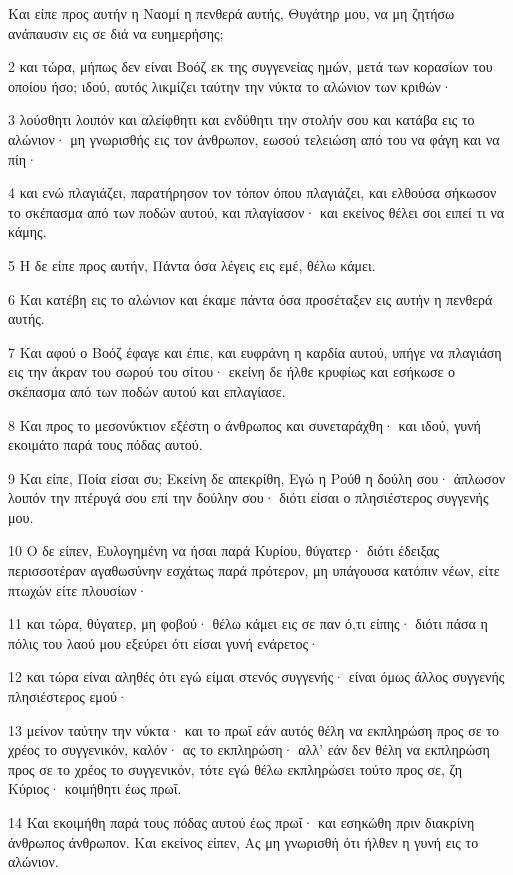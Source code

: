 \par Και είπε προς αυτήν η Ναομί η πενθερά αυτής, Θυγάτηρ μου, να μη ζητήσω ανάπαυσιν εις σε διά να ευημερήσης;
\par 2 και τώρα, μήπως δεν είναι Βοόζ εκ της συγγενείας ημών, μετά των κορασίων του οποίου ήσο; ιδού, αυτός λικμίζει ταύτην την νύκτα το αλώνιον των κριθών·
\par 3 λούσθητι λοιπόν και αλείφθητι και ενδύθητι την στολήν σου και κατάβα εις το αλώνιον· μη γνωρισθής εις τον άνθρωπον, εωσού τελειώση από του να φάγη και να πίη·
\par 4 και ενώ πλαγιάζει, παρατήρησον τον τόπον όπου πλαγιάζει, και ελθούσα σήκωσον το σκέπασμα από των ποδών αυτού, και πλαγίασον· και εκείνος θέλει σοι ειπεί τι να κάμης.
\par 5 Η δε είπε προς αυτήν, Πάντα όσα λέγεις εις εμέ, θέλω κάμει.
\par 6 Και κατέβη εις το αλώνιον και έκαμε πάντα όσα προσέταξεν εις αυτήν η πενθερά αυτής.
\par 7 Και αφού ο Βοόζ έφαγε και έπιε, και ευφράνη η καρδία αυτού, υπήγε να πλαγιάση εις την άκραν του σωρού του σίτου· εκείνη δε ήλθε κρυφίως και εσήκωσε ο σκέπασμα από των ποδών αυτού και επλαγίασε.
\par 8 Και προς το μεσονύκτιον εξέστη ο άνθρωπος και συνεταράχθη· και ιδού, γυνή εκοιμάτο παρά τους πόδας αυτού.
\par 9 Και είπε, Ποία είσαι συ; Εκείνη δε απεκρίθη, Εγώ η Ρούθ η δούλη σου· άπλωσον λοιπόν την πτέρυγά σου επί την δούλην σου· διότι είσαι ο πλησιέστερος συγγενής μου.
\par 10 Ο δε είπεν, Ευλογημένη να ήσαι παρά Κυρίου, θύγατερ· διότι έδειξας περισσοτέραν αγαθωσύνην εσχάτως παρά πρότερον, μη υπάγουσα κατόπιν νέων, είτε πτωχών είτε πλουσίων·
\par 11 και τώρα, θύγατερ, μη φοβού· θέλω κάμει εις σε παν ό,τι είπης· διότι πάσα η πόλις του λαού μου εξεύρει ότι είσαι γυνή ενάρετος·
\par 12 και τώρα είναι αληθές ότι εγώ είμαι στενός συγγενής· είναι όμως άλλος συγγενής πλησιέστερος εμού·
\par 13 μείνον ταύτην την νύκτα· και το πρωΐ εάν αυτός θέλη να εκπληρώση προς σε το χρέος το συγγενικόν, καλόν· ας το εκπληρώση· αλλ' εάν δεν θέλη να εκπληρώση προς σε το χρέος το συγγενικόν, τότε εγώ θέλω εκπληρώσει τούτο προς σε, ζη Κύριος· κοιμήθητι έως πρωΐ.
\par 14 Και εκοιμήθη παρά τους πόδας αυτού έως πρωΐ· και εσηκώθη πριν διακρίνη άνθρωπος άνθρωπον. Και εκείνος είπεν, Ας μη γνωρισθή ότι ήλθεν η γυνή εις το αλώνιον.
